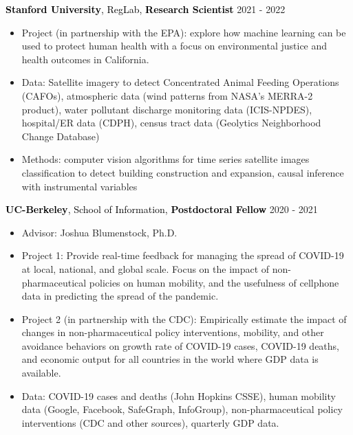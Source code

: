 \documentclass[margin,line]{res}                          %
\newenvironment{list1}{
  \begin{list}{\ding{113}}{%
      \setlength{\itemsep}{0in}
      \setlength{\parsep}{0in} \setlength{\parskip}{0in}
      \setlength{\topsep}{0in} \setlength{\partopsep}{0in} 
      \setlength{\leftmargin}{0.17in}}}{\end{list}}
\begin{document}
\begin{resume}
\begin{list1}
\item[] \textcolor{Black}{\textbf{Stanford University}, RegLab, \textbf{Research Scientist}} \hspace{4.7cm}2021 - 2022

\begin{itemize}
\item Project (in partnership with the EPA): explore how machine learning can be used to protect human health with a focus on environmental justice and health outcomes in California. 
\item Data: Satellite imagery to detect Concentrated Animal Feeding Operations (CAFOs), atmospheric data (wind patterns from NASA's MERRA-2 product), water pollutant discharge monitoring data (ICIS-NPDES), hospital/ER data (CDPH), census tract data (Geolytics Neighborhood Change Database)
\item Methods: computer vision algorithms for time series satellite images classification to detect building construction and expansion, causal inference with instrumental variables
\end{itemize}
\item[]


\item[] \textcolor{Black}{\textbf{UC-Berkeley}, School of Information, \textbf{Postdoctoral Fellow}} \hspace{3.7cm}2020 - 2021

\begin{itemize}
\item Advisor: Joshua Blumenstock, Ph.D.
\item Project 1: Provide real-time feedback for managing the spread of COVID-19 at local, national, and global scale. Focus on the impact of non-pharmaceutical policies on human mobility, and the usefulness of cellphone data in predicting the spread of the pandemic.

\item Project 2 (in partnership with the CDC): Empirically estimate the impact of changes in non-pharmaceutical policy interventions, mobility, and other avoidance behaviors on growth rate of COVID-19 cases, COVID-19 deaths, and economic output for all countries in the world where GDP data is available.

\item Data: COVID-19 cases and deaths (John Hopkins CSSE), human mobility data (Google, Facebook, SafeGraph, InfoGroup),  non-pharmaceutical policy interventions (CDC and other sources), quarterly GDP data.


\end{itemize}
\end{list1}
\end{resume}
\end{document}

